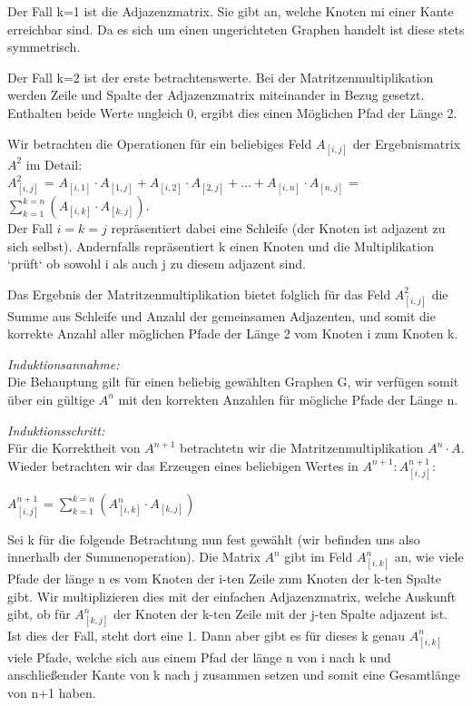 \documentclass{article}
\begin{document}
\begin{enumerate}[\bfseries1.]
\begin{enumerate}
Der Fall k=1 ist die Adjazenzmatrix. Sie gibt an, welche Knoten mi einer
Kante erreichbar sind. 
Da es sich um einen ungerichteten Graphen handelt ist diese stets symmetrisch.

Der Fall k=2 ist der erste betrachtenswerte. Bei der Matritzenmultiplikation
werden Zeile und Spalte der Adjazenzmatrix miteinander in Bezug gesetzt.
Enthalten beide Werte ungleich 0, ergibt dies einen Möglichen
Pfad der Länge 2.

Wir betrachten die Operationen für ein beliebiges Feld
$A_{[i,j]}$ der Ergebnismatrix $A^2$ im Detail: \\
$A^2_{[i,j]}$ = 
$A_{[i,1]} \cdot A_{[1,j]} + A_{[i,2]} \cdot A_{[2,j]} + \ldots + A_{[i,n]}
\cdot A_{[n,j]}$ = 
$\sum_{k=1}^{k=n}(A_{[i,k]} \cdot A_{[k,j]})$. \\Der Fall
$i=k=j$ repräsentiert dabei eine Schleife (der Knoten ist adjazent zu sich
selbst). Andernfalls repräsentiert k einen Knoten und die Multiplikation `prüft`
ob sowohl i als auch j zu diesem adjazent sind.

Das Ergebnis der Matritzenmultiplikation bietet folglich für das Feld
$A^2_{[i,j]}$ die Summe aus Schleife und Anzahl der gemeinsamen Adjazenten, und
somit die korrekte Anzahl aller möglichen Pfade der Länge 2 vom Knoten i zum
Knoten k.

\textit{Induktionsannahme:}\\
Die Behauptung gilt für einen beliebig gewählten Graphen G, wir verfügen somit
über ein gültige $A^n$ mit den korrekten Anzahlen für mögliche Pfade der Länge
n.

\textit{Induktionsschritt:}\\
Für die Korrektheit von $A^{n+1}$ betrachtetn wir die Matritzenmultiplikation
$A^{n} \cdot A$. Wieder betrachten wir das Erzeugen eines beliebigen Wertes in
$A^{n+1}: A^{n+1}_{[i,j]}$:

$A^{n+1}_{[i,j]} = \sum_{k=1}^{k=n}(A^n_{[i,k]} \cdot A_{[k,j]})$

Sei k für die folgende Betrachtung nun fest gewählt (wir befinden uns also
innerhalb der Summenoperation).
Die Matrix $A^n$ gibt im Feld $A^n_{[i,k]}$ an, wie viele Pfade der länge n es vom Knoten der i-ten Zeile zum Knoten der k-ten Spalte gibt. Wir multiplizieren
dies mit der einfachen Adjazenzmatrix, welche Auskunft gibt, ob für
$A^n_{[k,j]}$ der Knoten der k-ten Zeile mit der j-ten Spalte adjazent ist. Ist
dies der Fall, steht dort eine 1. Dann aber gibt es für dieses k genau
$A^n_{[i,k]}$ viele Pfade, welche sich aus einem Pfad der länge n von i
nach k und anschließender Kante von k nach j zusammen setzen und somit eine
Gesamtlänge von n+1 haben.


\end{enumerate}
\end{enumerate}
\end{document}

